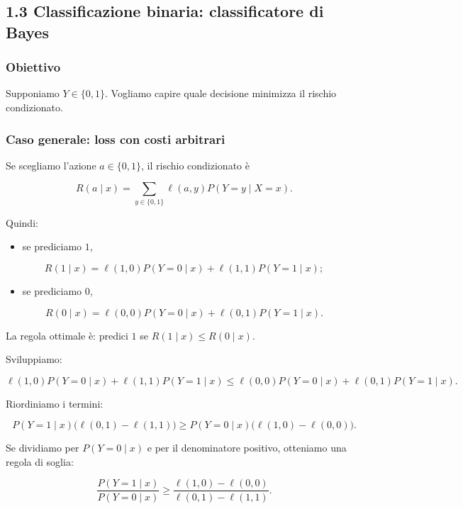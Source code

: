 \documentclass{article}
\providecommand{\tightlist}{%
  \setlength{\itemsep}{0pt}\setlength{\parskip}{0pt}}
\begin{document}
\subsection{1.3 Classificazione binaria: classificatore di
Bayes}\label{classificazione-binaria-classificatore-di-bayes}

\subsubsection{Obiettivo}\label{obiettivo-2}

Supponiamo \(Y\in\{0,1\}\). Vogliamo capire quale decisione minimizza il
rischio condizionato.

\subsubsection{Caso generale: loss con costi
arbitrari}\label{caso-generale-loss-con-costi-arbitrari}

Se scegliamo l'azione \(a\in\{0,1\}\), il rischio condizionato è

\[
R(a\mid x)=\sum_{y\in\{0,1\}}\ell(a,y)P(Y=y\mid X=x).
\]

Quindi:

\begin{itemize}
\tightlist
\item
  se prediciamo \(1\),
\end{itemize}

\[
R(1\mid x)=\ell(1,0)P(Y=0\mid x)+\ell(1,1)P(Y=1\mid x);
\]

\begin{itemize}
\tightlist
\item
  se prediciamo \(0\),
\end{itemize}

\[
R(0\mid x)=\ell(0,0)P(Y=0\mid x)+\ell(0,1)P(Y=1\mid x).
\]

La regola ottimale è: predici \(1\) se \(R(1\mid x)\le R(0\mid x)\).

Sviluppiamo:

\[
\ell(1,0)P(Y=0\mid x)+\ell(1,1)P(Y=1\mid x)
\le
\ell(0,0)P(Y=0\mid x)+\ell(0,1)P(Y=1\mid x).
\]

Riordiniamo i termini:

\[
P(Y=1\mid x)\big(\ell(0,1)-\ell(1,1)\big)
\ge
P(Y=0\mid x)\big(\ell(1,0)-\ell(0,0)\big).
\]

Se dividiamo per \(P(Y=0\mid x)\) e per il denominatore positivo,
otteniamo una regola di soglia:

\[
\frac{P(Y=1\mid x)}{P(Y=0\mid x)}
\ge
\frac{\ell(1,0)-\ell(0,0)}{\ell(0,1)-\ell(1,1)}.
\]
\end{document}
